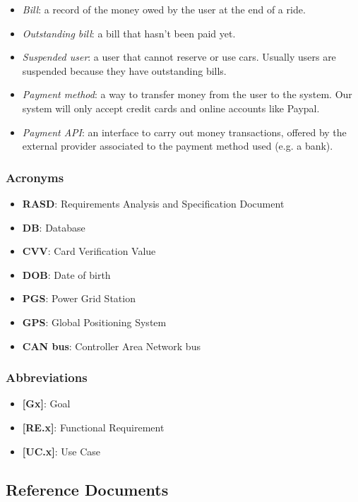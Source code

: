 \documentclass[english]{article}
\begin{document}
\begin{itemize}
\item{\textit{Bill}: a record of the money owed by the user at the end of a ride.}
\item{\textit{Outstanding bill}: a bill that hasn’t been paid yet. }
\item{\textit{Suspended user}: a user that cannot reserve or use cars. Usually users are suspended because they have outstanding bills.}
\item{\textit{Payment method}: a way to transfer money from the user to the system. Our system will only accept credit cards and online accounts like Paypal.}
\item{\textit{Payment API}: an interface to carry out money transactions, offered by the external provider associated to the payment method used (e.g. a bank).}
\end{itemize}

\subsubsection{Acronyms}
\begin{itemize}
\item{\textbf{RASD}: Requirements Analysis and Specification Document}
\item{\textbf{DB}: Database}
\item{\textbf{CVV}: Card Verification Value}
\item{\textbf{DOB}: Date of birth}
\item{\textbf{PGS}: Power Grid Station}
\item{\textbf{GPS}: Global Positioning System}
\item{\textbf{CAN bus}: Controller Area Network bus}
\end{itemize}

\subsubsection{Abbreviations}
\begin{itemize}
\item{\textbf{[Gx]}: Goal}
\item{\textbf{[RE.x]}: Functional Requirement}
\item{\textbf{[UC.x]}: Use Case}
\end{itemize}

\subsection{Reference Documents}
\end{document}

